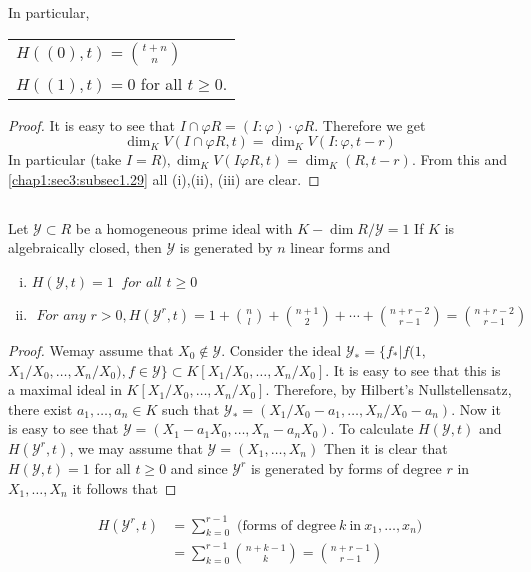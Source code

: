 In particular, 
\begin{tabular}[t]{l}
  $H((0),t) = \binom{t+n}{n}$\\
  $H((1),t) = 0$ for all  $t \geq 0$.
\end{tabular}

\begin{proof}
  It is easy to see that $I \cap \varphi R = (I: \varphi)\cdot \varphi
  R$. Therefore we get  
  $$
  \dim_K V(I \cap \varphi R, t) = \dim_K V(I: \varphi,  t-r)
  $$
  In particular (take $I= R),\dim_K V(I \varphi R, t) = \dim_K( R,
  t-r)$. From this and \ref{chap1:sec3:subsec1.29} all (i),(ii), (iii)
  are clear.  
\end{proof}

\setcounter{subsection}{30}
\subsection {}\label{chap1:sec3:subsec1.31}
Let $\mathscr{Y} \subset R$ be a homogeneous prime ideal
  with $K-\dim R/ \mathscr{Y} = 1$ If $K$ is algebraically closed,
  then $\mathscr{Y}$ is generated by $n$ linear forms and  
  \begin{enumerate}[(i)]
  \item $ H(\mathscr{Y},t) = 1~\textit{ for all } t \geq 0$
  \item $\textit{ For any } r >0,  H (\mathscr{Y}^r, t) = 1 +\binom n l+ 
    \binom{n+1}{2}+ \cdots + \binom{n+r-2}{r-1} = \binom{n+r-2}{r-1}$ 
  \end{enumerate}
  
\begin{proof}
  We\pageoriginale may assume that $X_0 \notin \mathscr{Y}$. Consider the ideal
  $\mathscr{Y}_* = \{ f_*|f(1,$ $X_1 / X_0, \ldots, X_n / X_0 ), f \in
  \mathscr{Y}\} \subset K[ X_1 / X_0, \ldots, X_n / X_0]$. It is easy to
  see that this is a maximal ideal in $K[ X_1 / X_0, \ldots, X_n /
    X_0]$. Therefore, by Hilbert's Nullstellensatz, there exist $a_1,
  \ldots, a_n \in K$ such that $\mathscr{Y}_*=(X_1 / X_0-a_1, \ldots, X_n
  / X_0-a_n)$. Now it is easy to see that $\mathscr{Y}=(X_1 -a_1 X_0,
  \ldots, X_n- a_n X_0)$. To calculate $H(\mathscr{Y},t)$ and
  $H(\mathscr{Y}^r,t)$, we may assume that $\mathscr{Y}= (X_1,
  \ldots, X_n)$ Then it is clear that $H(\mathscr{Y},t)=1$ for all $t
  \geq 0$ and since $\mathscr{Y}^r$ is generated by forms of degree $r$
  in $X_1, \ldots, X_n$ it follows that 
\end{proof}

\begin{align*}
  H(\mathscr {Y}^r,t) & = \sum^{r-1}_{k=0} \text{ (forms of degree}~ k
  ~\text{in}~   x_1, \ldots, x_n )\\ 
  & =\sum^{r-1}_{k=0} \binom{n+k-1}{k}= \binom{n+r-1}{r-1}
\end{align*}

